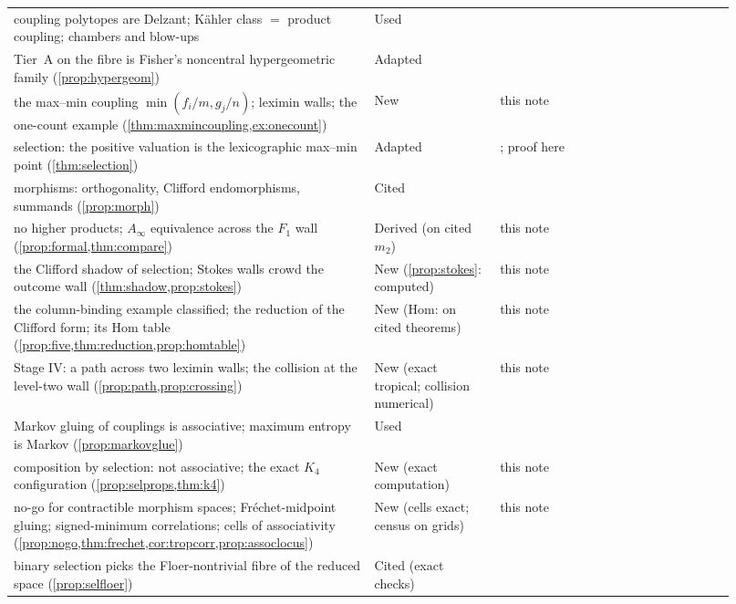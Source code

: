 \documentclass[11pt]{article}
\theoremstyle{definition}\newtheorem{definition}[theorem]{Definition}\newtheorem{remark}[theorem]{Remark}\newtheorem{example}[theorem]{Example}\newtheorem{problem}[theorem]{Open problem}\crefname{problem}{Problem}{Problems}
\begin{document}
{\begin{longtable}{p{0.46\linewidth}p{0.16\linewidth}p{0.3\linewidth}}
\rowcolor{stUsed} coupling polytopes are Delzant; K\"ahler class $=$ product coupling; chambers and blow-ups & Used & \cite{Awasthi2026Cpl}\\
\rowcolor{stAdapted} Tier~A on the fibre is Fisher's noncentral hypergeometric family (\cref{prop:hypergeom}) & Adapted & \cite{Fisher1935,BishopFienbergHolland1975}\\
\rowcolor{stNew} the max--min coupling $\min(f_i/m,g_j/n)$; leximin walls; the one-count example (\cref{thm:maxmincoupling,ex:onecount}) & New & this note\\
\rowcolor{stAdapted} selection: the positive valuation is the lexicographic max--min point (\cref{thm:selection}) & Adapted & \cite{FOOO2010,JuddRietsch2019,CominettiSanMartin1994}; proof here\\
\rowcolor{stCited} morphisms: orthogonality, Clifford endomorphisms, summands (\cref{prop:morph}) & Cited & \cite{ChoOh2006,Cho2005,Smith2018}\\
\rowcolor{stDerived} no higher products; $A_\infty$ equivalence across the $F_1$ wall (\cref{prop:formal,thm:compare}) & Derived (on cited $m_2$) & this note\\
\rowcolor{stNew} the Clifford shadow of selection; Stokes walls crowd the outcome wall (\cref{thm:shadow,prop:stokes}) & New (\ref{prop:stokes}: computed) & this note\\
\rowcolor{stNew} the column-binding example classified; the reduction of the Clifford form; its Hom table (\cref{prop:five,thm:reduction,prop:homtable}) & New (Hom: on cited theorems) & this note\\
\rowcolor{stNew} Stage IV: a path across two leximin walls; the collision at the level-two wall (\cref{prop:path,prop:crossing}) & New (exact tropical; collision numerical) & this note\\
\rowcolor{stUsed} Markov gluing of couplings is associative; maximum entropy is Markov (\cref{prop:markovglue}) & Used & \cite{Fritz2020}\\
\rowcolor{stNew} composition by selection: not associative; the exact $K_4$ configuration (\cref{prop:selprops,thm:k4}) & New (exact computation) & this note\\
\rowcolor{stNew} no-go for contractible morphism spaces; Fr\'echet-midpoint gluing; signed-minimum correlations; cells of associativity (\cref{prop:nogo,thm:frechet,cor:tropcorr,prop:assoclocus}) & New (cells exact; census on grids) & this note\\
\rowcolor{stCited} binary selection picks the Floer-nontrivial fibre of the reduced space (\cref{prop:selfloer}) & Cited (exact checks) & \cite{ChoOh2006,AlstonAmorim2010,FOOO2010}\\

\end{longtable}}
\end{document}
